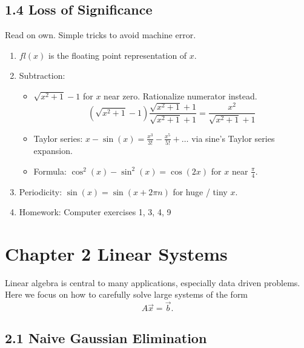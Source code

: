 \documentclass{article}
\newcommand{\ds}{\displaystyle}
\theoremstyle{remark}
\begin{document}
\subsection{1.4 Loss of Significance}
Read on own. Simple tricks to avoid machine error.
\begin{enumerate}
\item $fl(x)$ is the floating point representation of $x$.
\item Subtraction:
\begin{itemize}
\item $\ds \sqrt{x^2+1} - 1$ for $x$ near zero. Rationalize numerator instead.
\[
(\sqrt{x^2+1} -1) \frac{\sqrt{x^2+1} + 1}{\sqrt{x^2+1} + 1} = \frac{x^2}{\sqrt{x^2+1} + 1}
\]
\item Taylor series: $\ds x - \sin(x) = \frac{x^3}{3!} - \frac{x^5}{5!} + \dots$ via sine's Taylor series expansion.
\item Formula: $\ds \cos^2(x)-\sin^2(x) = \cos(2x)$ for $x$ near $\frac{\pi}{4}$.
\end{itemize}
\item Periodicity: $\sin(x) = \sin(x+2\pi n)$ for huge / tiny $x$. 

\item Homework: Computer exercises 1, 3, 4, 9
\end{enumerate}


\section{Chapter 2 Linear Systems} 

Linear algebra is central to many applications, especially data driven problems. Here we focus on how to carefully solve large systems of the form
\[
A \vec{x} = \vec{b}.
\]

\subsection{2.1 Naive Gaussian Elimination}
\end{document}
